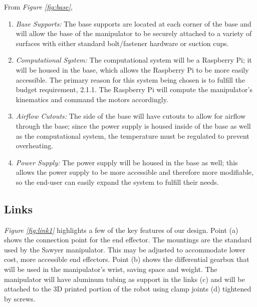 \documentclass[12pt]{report}
\begin{document}
From \emph{Figure \ref{fig:base}},
\vspace{-\baselineskip}
\begin{enumerate}[label=\alph*.]
  \item \emph{Base Supports:}
  The base supports are located at each corner of the base and will allow the base of the manipulator to be securely attached to a variety of surfaces with either standard bolt/fastener hardware or suction cups.
  \item \emph{Computational System:}
  The computational system will be a Raspberry Pi; it will be housed in the base, which allows the Raspberry Pi to be more easily accessible. The primary reason for this system being chosen is to fulfill the budget requirement, 2.1.1. The Raspberry Pi will compute the manipulator's kinematics and command the motors accordingly.
  \item \emph{Airflow Cutouts:}
  The side of the base will have cutouts to allow for airflow through the base; since the power supply is housed inside of the base as well as the computational system, the temperature must be regulated to prevent overheating.
  \item \emph{Power Supply:}
  The power supply will be housed in the base as well; this allows the power supply to be more accessible and therefore more modifiable, so the end-user can easily expand the system to fulfill their needs.
\end{enumerate}
\subsection{Links}
\emph{Figure \ref{fig:link1}} highlights a few of the key features of our design. Point (a) shows the connection point for the end effector. The mountings are the standard used by the Sawyer manipulator. This may be adjusted to accommodate lower cost, more accessible end effectors. Point (b) shows the differential gearbox that will be used in the manipulator’s wrist, saving space and weight. The manipulator will have aluminum tubing as support in the links (c) and will be attached to the 3D printed portion of the robot using clamp joints (d) tightened by screws.
\end{document}
